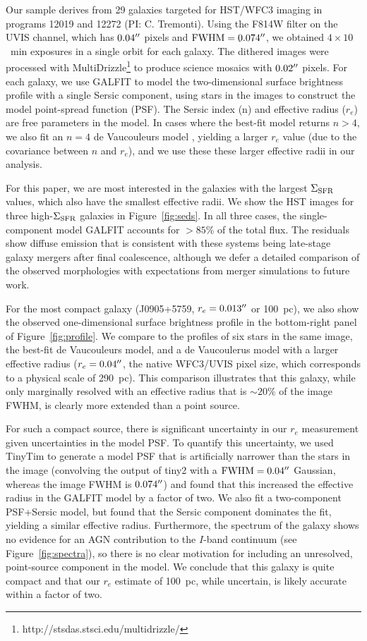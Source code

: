 \documentclass[apj]{emulateapj}
\newcommand{\sigmasfr}{\Sigma_{\textnormal{\scriptsize{SFR}}}}
\begin{document}
Our sample derives from 29 galaxies targeted for HST/WFC3 imaging in
programs 12019 and 12272 (PI: C. Tremonti).  Using the F814W filter on
the UVIS channel, which has $0.04\mbox{$^{\prime\prime}$}$ pixels and
$\textnormal{FWHM}=0.074\mbox{$^{\prime\prime}$}$, we obtained $4\times10$~min
exposures in a single orbit for each galaxy.  The dithered images were
processed with
MultiDrizzle\footnote{http://stsdas.stsci.edu/multidrizzle/} to
produce science mosaics with $0.02\mbox{$^{\prime\prime}$}$ pixels.  For each galaxy,
we use GALFIT \citep{pen02,pen10} to model the two-dimensional surface
brightness profile with a single Sersic component, using stars in the
images to construct the model point-spread function (PSF).  The Sersic
index (n) and effective radius ($r_e$) are free parameters in the
model.  In cases where the best-fit model returns $n>4$, we also fit
an $n=4$ de Vaucouleurs model \citep{dev48}, yielding a larger $r_e$
value (due to the covariance between $n$ and $r_e$), and we use these
these larger effective radii in our analysis.

For this paper, we are most interested in the galaxies with the
largest $\sigmasfr$ values, which also have the smallest effective
radii.  We show the HST images for three high-$\sigmasfr$ galaxies in
Figure~\ref{fig:seds}.  In all three cases, the single-component model
GALFIT accounts for $>85\%$ of the total flux.  The residuals show
diffuse emission that is consistent with these systems being
late-stage galaxy mergers after final coalescence, although we defer a
detailed comparison of the observed morphologies with expectations
from merger simulations to future work.

For the most compact galaxy (J0905+5759, $r_e=0.013\mbox{$^{\prime\prime}$}$ or
100~pc), we also show the observed one-dimensional surface brightness
profile in the bottom-right panel of Figure~\ref{fig:profile}.  We
compare to the profiles of six stars in the same image, the best-fit
de Vaucouleurs model, and a de Vaucoulerus model with a larger
effective radius ($r_e=0.04\mbox{$^{\prime\prime}$}$, the native WFC3/UVIS pixel size,
which corresponds to a physical scale of 290~pc).  This comparison
illustrates that this galaxy, while only marginally resolved with an
effective radius that is $\sim20\%$ of the image FWHM, is clearly more
extended than a point source.

For such a compact source, there is significant uncertainty in our
$r_e$ measurement given uncertainties in the model PSF.  To quantify
this uncertainty, we used TinyTim to generate a model PSF that is
artificially narrower than the stars in the image (convolving the
output of tiny2 with a $\textnormal{FWHM}=0.04\mbox{$^{\prime\prime}$}$ Gaussian,
whereas the image FWHM is $0.074\mbox{$^{\prime\prime}$}$) and found that this
increased the effective radius in the GALFIT model by a factor of two.
We also fit a two-component PSF+Sersic model, but found that the
Sersic component dominates the fit, yielding a similar effective
radius.  Furthermore, the spectrum of the galaxy shows no evidence for
an AGN contribution to the $I$-band continuum (see
Figure~\ref{fig:spectra}), so there is no clear motivation for
including an unresolved, point-source component in the model.  We
conclude that this galaxy is quite compact and that our $r_e$ estimate
of 100~pc, while uncertain, is likely accurate within a factor of two.
\end{document}

